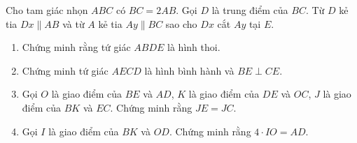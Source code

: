 \begin{bt}%
	Cho tam giác nhọn $ABC$ có $BC=2AB$. Gọi $D$ là trung điểm của $BC$. Từ $D$ kẻ tia $Dx \parallel AB$ và từ $A$ kẻ tia $Ay \parallel BC$ sao cho $Dx$ cắt $Ay$ tại $E$.
	\begin{enumerate}
		\item Chứng minh rằng tứ giác $ABDE$ là hình thoi.
		\item Chứng minh tứ giác $AECD$ là hình bình hành và $BE \perp CE$.
		\item Gọi $O$ là giao điểm của $BE$ và $AD$, $K$ là giao điểm của $DE$ và $OC$, $J$ là giao điểm của $BK$ và $EC$. Chứng minh rằng $JE=JC$.
		\item Gọi $I$ là giao điểm của $BK$ và $OD$. Chứng minh rằng $4\cdot IO =AD$.
	\end{enumerate}
\end{bt}
